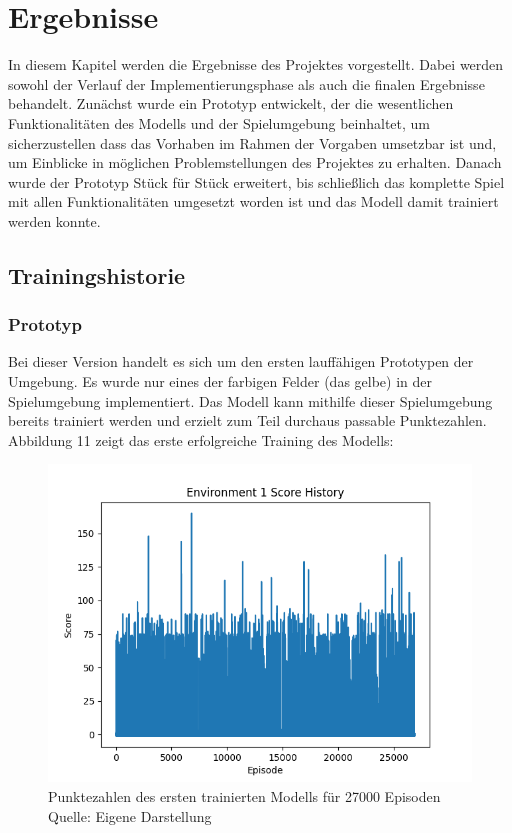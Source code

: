 \section{Ergebnisse}
In diesem Kapitel werden die Ergebnisse des Projektes vorgestellt. Dabei werden sowohl der Verlauf der Implementierungsphase als auch die finalen Ergebnisse behandelt. Zunächst wurde ein Prototyp entwickelt, der die wesentlichen Funktionalitäten des Modells und der Spielumgebung beinhaltet, um sicherzustellen dass das Vorhaben im Rahmen der Vorgaben umsetzbar ist und, um Einblicke in möglichen Problemstellungen des Projektes zu erhalten. Danach wurde der Prototyp Stück für Stück erweitert, bis schließlich das komplette Spiel mit allen Funktionalitäten umgesetzt worden ist und das Modell damit trainiert werden konnte.
\subsection{Trainingshistorie}
\subsubsection{Prototyp}
Bei dieser Version handelt es sich um den ersten lauffähigen Prototypen der Umgebung. Es wurde nur eines der farbigen Felder (das gelbe) in der Spielumgebung implementiert. Das Modell kann mithilfe dieser Spielumgebung bereits trainiert werden und erzielt zum Teil durchaus passable Punktezahlen.\\

Abbildung 11 zeigt das erste erfolgreiche Training des Modells:
\nopagebreak
\begin{figure}[H]
	\includegraphics[width=1\textwidth]{Bilder/firstpropertraining} 
	\caption[Punktezahlen des ersten trainierten Modells für 27000 Episoden]{Punktezahlen des ersten trainierten Modells für 27000 Episoden\\ Quelle: Eigene Darstellung}
\end{figure}

